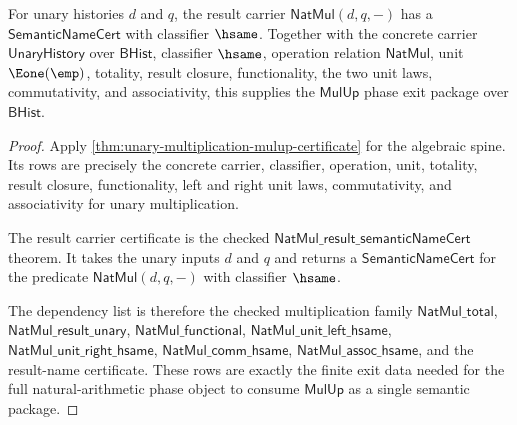 \begin{theorem}
\label{thm:unary-multiplication-mulup-semantic-exit-package}
For unary histories $d$ and $q$, the result carrier
$\mathsf{NatMul}(d,q,-)$ has a $\mathsf{SemanticNameCert}$ with classifier
$\hsame$. Together with the concrete carrier $\mathsf{UnaryHistory}$ over
$\mathsf{BHist}$, classifier $\hsame$, operation relation $\mathsf{NatMul}$,
unit $\Eone(\emp)$, totality, result closure, functionality, the two unit
laws, commutativity, and associativity, this supplies the $\mathsf{MulUp}$
phase exit package over $\mathsf{BHist}$.
\end{theorem}
\begin{proof}
Apply \autoref{thm:unary-multiplication-mulup-certificate} for the algebraic
spine. Its rows are precisely the concrete carrier, classifier, operation,
unit, totality, result closure, functionality, left and right unit laws,
commutativity, and associativity for unary multiplication.

The result carrier certificate is the checked
$\mathsf{NatMul\_result\_semanticNameCert}$ theorem. It takes the unary inputs
$d$ and $q$ and returns a $\mathsf{SemanticNameCert}$ for the predicate
$\mathsf{NatMul}(d,q,-)$ with classifier $\hsame$.

The dependency list is therefore the checked multiplication family
$\mathsf{NatMul\_total}$, $\mathsf{NatMul\_result\_unary}$,
$\mathsf{NatMul\_functional}$, $\mathsf{NatMul\_unit\_left\_hsame}$,
$\mathsf{NatMul\_unit\_right\_hsame}$, $\mathsf{NatMul\_comm\_hsame}$,
$\mathsf{NatMul\_assoc\_hsame}$, and the result-name certificate. These rows
are exactly the finite exit data needed for the full natural-arithmetic phase
object to consume $\mathsf{MulUp}$ as a single semantic package.
\end{proof}

